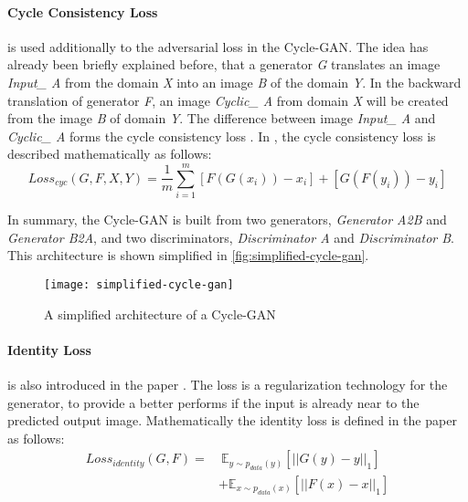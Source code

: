 \documentclass[fleqn,10pt]{SelfArx} %
\begin{document}
\paragraph{Cycle Consistency Loss} is used additionally to the adversarial loss in the Cycle-\ac{GAN}. The idea has already been briefly explained before, that a generator \textit{G} translates an image \textit{Input\_ A} from the domain \textit{X} into an image \textit{B} of the domain \textit{Y}. In the backward translation of generator \textit{F}, an image \textit{Cyclic\_ A} from domain \textit{X} will be created from the image \textit{B} of domain \textit{Y}. The difference between image \textit{Input\_ A} and \textit{Cyclic\_ A} forms the cycle consistency loss \cite{Introduction-to-Cycle-GANs}. In \cite{Introduction-to-Cycle-GANs}, the cycle consistency loss is described mathematically as follows:
\begin{equation*}
	Loss_{cyc}(G,F,X,Y) = \frac{1}{m} \sum^{m}_{i=1}[F(G(x_i))-x_i]+[G(F(y_i))-y_i]
\end{equation*}

In summary, the Cycle-\ac{GAN} is built from two generators, \textit{Generator A2B} and \textit{Generator B2A}, and two discriminators, \textit{Discriminator A} and \textit{Discriminator B}. This architecture is shown simplified in \autoref{fig:simplified-cycle-gan}.

\begin{figure}[htb] 
	\centering 
	\texttt{[image: simplified-cycle-gan]}
	\caption{A simplified architecture of a Cycle-\ac{GAN} \cite{Introduction-to-Cycle-GANs}}
	\label{fig:simplified-cycle-gan}
\end{figure}

\paragraph{Identity Loss} is also introduced in the paper \cite{image-to-image-ccan}. The loss is a regularization technology for the generator, to provide a better performs if the input is already near to the predicted output image. Mathematically the identity loss is defined in the paper \cite{image-to-image-ccan} as follows:
\begin{equation*}
\begin{split}
	Loss_{identity}(G,F) =&~\mathbb E_{y \sim p_{data}(y)}[||G(y) - y||_1] \\\
&+ \mathbb E_{x \sim p_{data}(x)}[||F(x)-x||_1]
\end{split}
\end{equation*}
\end{document}
